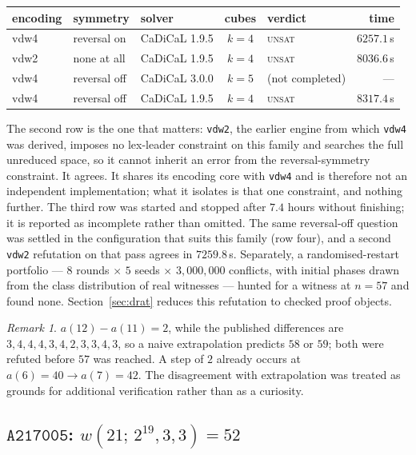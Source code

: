 \documentclass[12pt]{article}
\theoremstyle{remark}
\newtheorem{remark}{Remark}
\newcommand{\seq}[1]{\texttt{#1}}
\begin{document}
\begin{center}
\begin{tabular}{lllclr}
\toprule
encoding & symmetry & solver & cubes & verdict & time \\
\midrule
vdw4 & reversal on & CaDiCaL 1.9.5 & $k=4$ & \textsc{unsat} & $6257.1$\,s \\
vdw2 & none at all & CaDiCaL 1.9.5 & $k=4$ & \textsc{unsat} & $8036.6$\,s \\
vdw4 & reversal off & CaDiCaL 3.0.0 & $k=5$ & (not completed) & --- \\
vdw4 & reversal off & CaDiCaL 1.9.5 & $k=4$ & \textsc{unsat} & $8317.4$\,s \\
\bottomrule
\end{tabular}
\end{center}

The second row is the one that matters: \texttt{vdw2}, the earlier
engine from which \texttt{vdw4} was derived, imposes no lex-leader constraint
on this family and searches the full unreduced space, so it cannot inherit an
error from the reversal-symmetry constraint. It agrees. It shares its
encoding core with \texttt{vdw4} and is therefore not an independent
implementation; what it isolates is that one constraint, and nothing further. The third row was started and
stopped after $7.4$ hours without finishing; it is reported as incomplete
rather than omitted. The same reversal-off question was settled in the
configuration that suits this family (row four), and a second \texttt{vdw2}
refutation on that pass agrees in $7259.8$\,s. Separately, a
randomised-restart portfolio --- $8$ rounds $\times$ $5$ seeds $\times$
$3{,}000{,}000$ conflicts, with initial phases drawn from the class
distribution of real witnesses --- hunted for a witness at $n=57$ and found
none. Section~\ref{sec:drat} reduces this refutation to checked proof
objects.

\begin{remark}
$a(12)-a(11)=2$, while the published differences are
$3,4,4,4,3,4,2,3,3,4,3$, so a naive extrapolation predicts $58$ or $59$;
both were refuted before $57$ was reached. A step of $2$ already occurs at
$a(6)=40 \to a(7)=42$. The disagreement with extrapolation was treated as
grounds for additional verification rather than as a curiosity.
\end{remark}

\subsection{$\seq{A217005}$: $w(21;\,2^{19},3,3)=52$}\label{sec:a217005}
\end{document}
